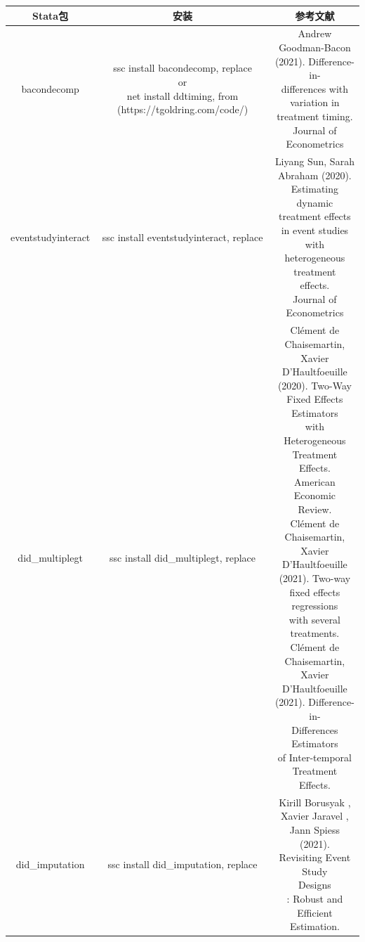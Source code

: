 \documentclass[cn,12pt,math=newtx,citestyle=gb7714-2015,bibstyle=gb7714-2015]{elegantbook}
\makeatletter
\newcommand{\tabincell}[2]{\begin{tabular}{@{}#1@{}}#2\end{tabular}}  %
\makeatother
\begin{document}
	\begin{table}[htbp]
		\centering
		\caption{交叠DID的Stata包及对应文献}
		\begin{longtable}{|c|c|c|}
			\hline
			Stata包&安装  & 参考文献 \\
			\hline
			bacondecomp& \tabincell{c}{ ssc install bacondecomp, replace
				\\
				or
				\\
				net install ddtiming, from (https://tgoldring.com/code/)} & \tabincell{c}{ Andrew Goodman-Bacon\\(2021). Difference-in-\\differences with \\variation in \\treatment timing. \\Journal of Econometrics}\\
			\hline
			eventstudyinteract & ssc install eventstudyinteract, replace & \tabincell{c}{ Liyang Sun, Sarah \\Abraham (2020).\\ Estimating dynamic \\treatment effects\\ in event studies with\\ heterogeneous treatment \\effects. \\Journal of Econometrics}\\
			\hline
			did\_multiplegt &	ssc install did\_multiplegt, replace & \tabincell{c}{Clément de Chaisemartin,\\ Xavier D'Haultfoeuille \\(2020). Two-Way \\Fixed Effects Estimators \\with Heterogeneous \\Treatment Effects. \\American Economic \\Review.\\
				Clément de Chaisemartin, \\Xavier D'Haultfoeuille \\(2021). Two-way\\ fixed effects regressions\\ with several treatments.\\
				Clément de Chaisemartin, \\Xavier D'Haultfoeuille \\(2021). Difference-in-\\Differences Estimators \\of Inter-temporal \\Treatment Effects.} \\
			\hline
			did\_imputation&	ssc install did\_imputation, replace& \tabincell{c}{Kirill Borusyak , \\Xavier Jaravel , \\Jann Spiess  (2021). \\Revisiting Event Study \\Designs\\: Robust and Efficient \\Estimation.} \\
			\hline
			

\end{longtable}
\end{table}
\end{document}
